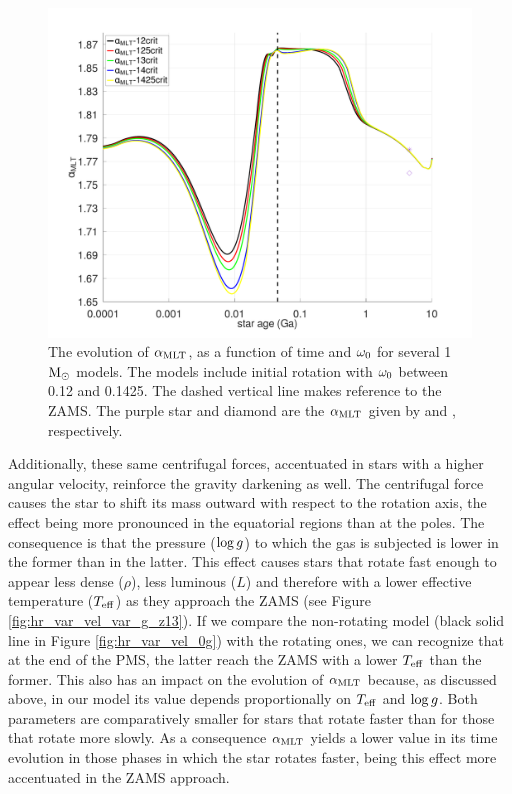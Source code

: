 \documentclass[fleqn,usenatbib]{mnras}
\begin{document}
\begin{figure}
	\includegraphics[clip,width=\columnwidth]{figures/paper2/alpha_mlt_var_vel_g3.pdf}
    \caption{The evolution of $\alpha_{\mathrm{MLT}}$, as a function of time and $\omega_{\mathrm{0}}$ for several 1 $\mathrm{M}_\odot$ models. The models include initial rotation with $\omega_{\mathrm{0}}$ between 0.12 and 0.1425. The dashed vertical line makes reference to the ZAMS. The purple star and diamond are the $\alpha_{\mathrm{MLT}}$ given by \citet{Sonoi2018} and \citet{Samadi2005}, respectively.}
    \label{fig:alpha_mlt_var_vel_g3}
\end{figure}

Additionally, these same centrifugal forces, accentuated in stars with a higher angular velocity, reinforce the gravity darkening \citep[see e.g. ][]{Eggenberger2012,Paxton2019,Gossage2021} as well. The centrifugal force causes the star to shift its mass outward with respect to the rotation axis, the effect being more pronounced in the equatorial regions than at the poles. The consequence is that the pressure ($\mathrm{log} \, g$) to which the gas is subjected is lower in the former than in the latter. This effect causes stars that rotate fast enough to appear less dense ($\rho$), less luminous ($L$) and therefore with a lower effective temperature ($T_{\mathrm{eff}}$) as they approach the ZAMS (see Figure \ref{fig:hr_var_vel_var_g_z13}). If we compare the non-rotating model (black solid line in Figure \ref{fig:hr_var_vel_0g}) with the rotating ones, we can recognize that at the end of the PMS, the latter reach the ZAMS with a lower $T_{\mathrm{eff}}$ than the former. This also has an impact on the evolution of $\alpha_{\mathrm{MLT}}$ because, as discussed above, in our model its value depends proportionally on $T_{\mathrm{eff}}$ and $\mathrm{log} \, g$. Both parameters are comparatively smaller for stars that rotate faster than for those that rotate more slowly. As a consequence $\alpha_{\mathrm{MLT}}$ yields a lower value in its time evolution in those phases in which the star rotates faster, being this effect more accentuated in the ZAMS approach.\par
\end{document}
